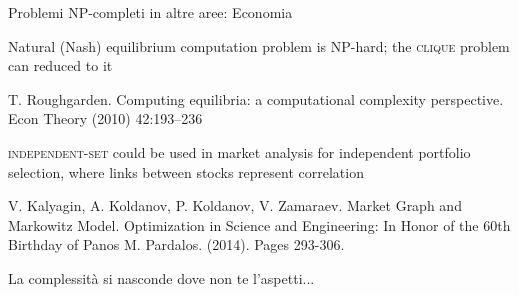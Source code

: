 \begin{frame}{Problemi NP-completi in altre aree: Economia}
    
\BIL
\item Natural (Nash) equilibrium computation problem is NP-hard; the \textsc{clique} problem can reduced to it
  \BI
  \item T. Roughgarden. Computing equilibria: a computational complexity
perspective. Econ Theory (2010) 42:193–236
  \EI
\item \textsc{independent-set} could be used in market analysis for independent portfolio selection, where links between stocks represent correlation
  \BI
  \item V. Kalyagin, A. Koldanov, P. Koldanov, V. Zamaraev. Market Graph and Markowitz Model. Optimization in Science and Engineering: In Honor of the 60th Birthday of Panos M. Pardalos. (2014). Pages 293-306.
  \EI 
\EIL

\end{frame}

\begin{frame}{La complessità si nasconde dove non te l'aspetti...}

\vspace{-15pt}

\end{frame}

